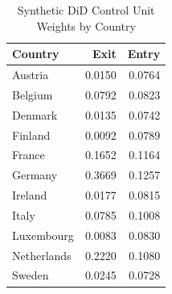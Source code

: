 \begin{table}[!h]
\centering
\caption{\label{tab:sdid_weights}Synthetic DiD Control Unit Weights by Country}
\centering
\begin{tabular}[t]{lrr}
\toprule
Country & Exit & Entry\\
\midrule
Austria & 0.0150 & 0.0764\\
Belgium & 0.0792 & 0.0823\\
Denmark & 0.0135 & 0.0742\\
Finland & 0.0092 & 0.0789\\
France & 0.1652 & 0.1164\\
\addlinespace
Germany & 0.3669 & 0.1257\\
Ireland & 0.0177 & 0.0815\\
Italy & 0.0785 & 0.1008\\
Luxembourg & 0.0083 & 0.0830\\
Netherlands & 0.2220 & 0.1080\\
\addlinespace
Sweden & 0.0245 & 0.0728\\
\bottomrule
\end{tabular}
\end{table}
